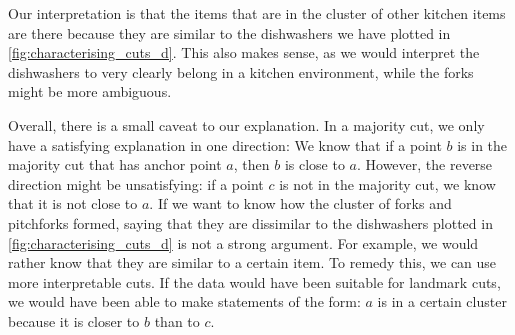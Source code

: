 Our interpretation is that the items that are in the cluster of other kitchen items are there because they are similar to
the dishwashers we have plotted in \autoref{fig:characterising_cuts_d}. This also makes sense, as we would interpret the dishwashers to very clearly belong in a kitchen environment, while the forks might be more ambiguous.

Overall, there is a small caveat to our explanation. In a majority cut, we only have a satisfying explanation in one direction: We know that if a point $b$ is in the majority cut that has anchor point $a$, 
then $b$ is close to $a$. However, the reverse direction might be unsatisfying: if a point $c$ is not in the majority cut, we know that it is not close to $a$. 
If we want to know how the cluster of forks and pitchforks formed, saying that they are dissimilar to the dishwashers plotted in \autoref{fig:characterising_cuts_d} is not a strong argument.
For example, we would rather know that they are similar to a certain item.  To remedy this, we can use more interpretable cuts. 
If the data would have been suitable for landmark cuts, we would have been able to make statements of the form: $a$ is in a certain cluster because it is closer to $b$ than to $c$.



